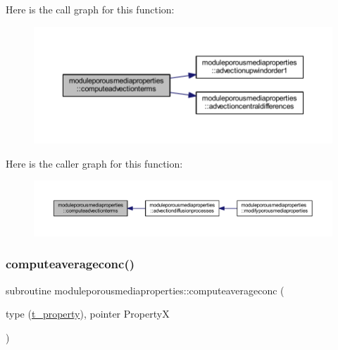 Here is the call graph for this function\+:\nopagebreak
\begin{figure}[H]
\begin{center}
\leavevmode
\includegraphics[width=350pt]{namespacemoduleporousmediaproperties_af0fd7f987acaa1a952f02b3bdedf1b8a_cgraph}
\end{center}
\end{figure}
Here is the caller graph for this function\+:\nopagebreak
\begin{figure}[H]
\begin{center}
\leavevmode
\includegraphics[width=350pt]{namespacemoduleporousmediaproperties_af0fd7f987acaa1a952f02b3bdedf1b8a_icgraph}
\end{center}
\end{figure}
\mbox{\label{namespacemoduleporousmediaproperties_ab84b0ba6c0a1df355fb649c05128fbb3}} 
\subsubsection{\texorpdfstring{computeaverageconc()}{computeaverageconc()}}
{\footnotesize\ttfamily subroutine moduleporousmediaproperties\+::computeaverageconc (\begin{DoxyParamCaption}\item[{type (\mbox{\hyperlink{structmoduleporousmediaproperties_1_1t__property}{t\+\_\+property}}), pointer}]{PropertyX }\end{DoxyParamCaption})\hspace{0.3cm}{\ttfamily [private]}}

